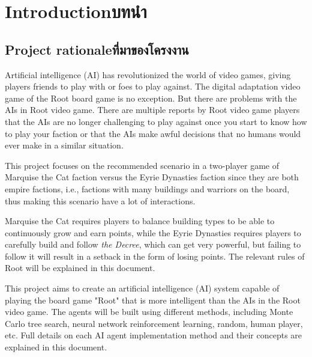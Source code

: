 \chapter{\ifenglish Introduction\else บทนำ\fi}

\section{\ifenglish Project rationale\else ที่มาของโครงงาน\fi}
Artificial intelligence (AI) has revolutionized the world of video games, giving players friends to play with or foes to play against. The digital adaptation video game of the Root board game is no exception. But there are problems with the AIs in Root video game. There are multiple reports by Root video game players that the AIs are no longer challenging to play against once you start to know how to play your faction or that the AIs make awful decisions that no humans would ever make in a similar situation.

This project focuses on the recommended scenario in a two-player game of Marquise the Cat faction versus the Eyrie Dynasties faction since they are both empire factions, i.e., factions with many buildings and warriors on the board, thus making this scenario have a lot of interactions.

%
%
Marquise the Cat requires players to balance building types to be able to continuously grow and earn points, while the Eyrie Dynasties requires players to carefully build and follow \textit{the Decree}, which can get very powerful, but failing to follow it will result in a setback in the form of losing points. The relevant rules of Root will be explained in this document.
%

This project aims to create an artificial intelligence (AI) system capable of playing the board game "Root" that is more intelligent than the AIs in the Root video game. The agents will be built using different methods, including Monte Carlo tree search, neural network reinforcement learning, random, human player, etc. Full details on each AI agent implementation method and their concepts are explained in this document.



